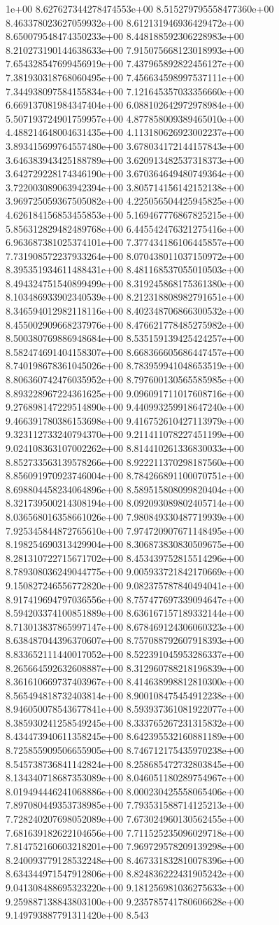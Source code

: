 1e+00	8.627627344278474553e+00	8.515279795558477360e+00	8.463378023627059932e+00	8.612131946936429472e+00	8.650079548474350233e+00	8.448188592306228983e+00	8.210273190144638633e+00	7.915075668123018993e+00	7.654328547699456919e+00	7.437965892822456127e+00	7.381930318768060495e+00	7.456634598997537111e+00	7.344938097584155834e+00	7.121645357033356660e+00	6.669137081984347404e+00	6.088102642972978984e+00	5.507193724901759957e+00	4.877858009389465010e+00	4.488214648004631435e+00	4.113180626923002237e+00	3.893415699764557480e+00	3.678034172144157843e+00	3.646383943425188789e+00	3.620913482537318373e+00	3.642729228174346190e+00	3.670364649480749364e+00	3.722003089063942394e+00	3.805714156142152138e+00	3.969725059367505082e+00	4.225056504425945825e+00	4.626184156853455853e+00	5.169467776867825215e+00	5.856312829482489768e+00	6.445542476321275416e+00	6.963687381025374101e+00	7.377434186106445857e+00	7.731908572237933264e+00	8.070438011037150972e+00	8.395351934611488431e+00	8.481168537055010503e+00	8.494324751540899499e+00	8.319245868175361380e+00	8.103486933902340539e+00	8.212318808982791651e+00	8.346594012982118116e+00	8.402348706866300532e+00	8.455002909668237976e+00	8.476621778485275982e+00	8.500380769886948684e+00	8.535159139425424257e+00	8.582474691404158307e+00	8.668366605686447457e+00	8.740198678361045026e+00	8.783959941048653519e+00	8.806360742476035952e+00	8.797600130565585985e+00	8.893228967224361625e+00	9.096091711017608716e+00	9.276898147229514890e+00	9.440993259918647240e+00	9.466391780386153698e+00	9.416752610427113979e+00	9.323112733240794370e+00	9.211411078227451199e+00	9.024108363107002262e+00	8.814410261336830033e+00	8.852733563139578266e+00	8.922211370298187560e+00	8.856091970923746004e+00	8.784266891100070751e+00	8.698804458234064896e+00	8.589515808099820404e+00	8.321739500214308194e+00	8.092093089802405714e+00	8.036568016358661026e+00	7.980849330487719939e+00	7.925345844872765610e+00	7.974720907671148495e+00	8.198254690313429904e+00	8.306873830830509675e+00	8.281310722715671702e+00	8.453439752815514296e+00	8.789308036249044775e+00	9.005933721842170669e+00	9.150827246556772820e+00	9.082375787840494041e+00	8.917419694797036556e+00	8.757477697339094647e+00	8.594203374100851889e+00	8.636167157189332144e+00	8.713013837865997147e+00	8.678469124306060323e+00	8.638487044396370607e+00	8.757088792607918393e+00	8.833652111440017052e+00	8.522391045953286337e+00	8.265664592632608887e+00	8.312960788218196839e+00	8.361610669737403967e+00	8.414638998812810300e+00	8.565494818732403814e+00	8.900108475454912238e+00	8.946050078543677841e+00	8.593937361081922077e+00	8.385930241258549245e+00	8.333765267231315832e+00	8.434473940611358245e+00	8.642395532160881189e+00	8.725855909506655905e+00	8.746712175435970238e+00	8.545738736841142824e+00	8.258685472732803845e+00	8.134340718687353089e+00	8.046051180289754967e+00	8.019494446241068886e+00	8.000230425558065406e+00	7.897080449353738985e+00	7.793531588714125213e+00	7.728240207698052089e+00	7.673024960130562455e+00	7.681639182622104656e+00	7.711525235096029718e+00	7.814752160603218201e+00	7.969729578209139298e+00	8.240093779128532248e+00	8.467331832810078396e+00	8.634344971547912806e+00	8.824836222431905242e+00	9.041308488695323220e+00	9.181256981036275633e+00	9.259887138843803100e+00	9.235785741780606628e+00	9.149793887791311420e+00	8.543